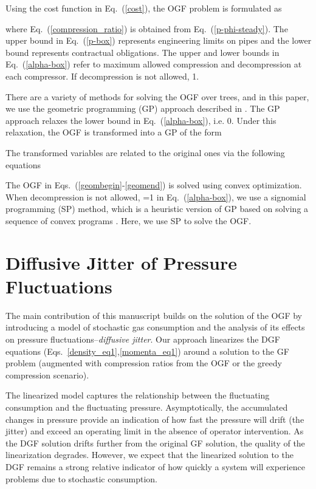 \documentclass[10pt, conference, compsocconf]{IEEEtran}
\begin{document}
Using the cost function in Eq.~(\ref{cost}), the OGF problem is formulated as

where Eq.~(\ref{compression_ratio}) is obtained from Eq.~(\ref{p-phi-steady}).
The upper bound in Eq.~(\ref{p-box}) represents engineering limits on pipes and the lower bound represents contractual obligations. The upper and lower bounds in Eq.~(\ref{alpha-box}) refer to maximum allowed compression and decompression at each compressor.  If decompression is not allowed, 1.

There are a variety of methods for solving the OGF over trees, and in this paper, we use the geometric programming (GP) approach described in  \cite{13MFBBCP}. The GP approach relaxes the lower bound   in Eq.~(\ref{alpha-box}), i.e. 0. Under this relaxation, the OGF is transformed into a GP of the form
 
  The transformed variables are related to the original ones via the following equations
  
The OGF in Eqs.~(\ref{geombegin}-\ref{geomend}) is solved using convex optimization. When decompression is not allowed, =1 in Eq.~(\ref{alpha-box}), we use a signomial programming (SP) method, which is a heuristic version of GP based on solving a sequence of convex programs \cite{13MFBBCP}.  Here, we use SP to solve the OGF.

\section{Diffusive Jitter of Pressure Fluctuations}
\label{sec:pressure_fluct}


The main contribution of this manuscript builds on the solution of the OGF by introducing a model of stochastic gas consumption and the analysis of its effects on pressure fluctuations--{\it diffusive jitter}.  Our approach linearizes the DGF equations (Eqs.~\ref{density_eq1},\ref{momenta_eq1}) around a solution to the GF problem (augmented with compression ratios from the OGF or the greedy compression scenario).

The linearized model captures the relationship between the fluctuating consumption and the fluctuating pressure. Asymptotically, the accumulated changes in pressure provide an indication of how fast the pressure will drift (the jitter) and exceed an operating limit in the absence of operator intervention. As the DGF solution drifts further from the original GF solution, the quality of the linearization degrades.  However, we expect that the linearized solution to the DGF remains a strong relative indicator of how quickly a system will experience problems due to stochastic consumption.
\end{document}
